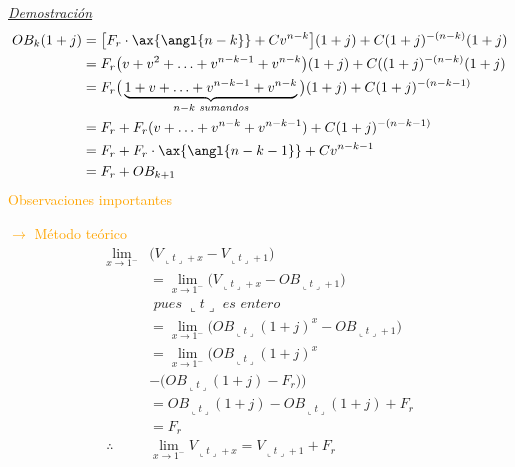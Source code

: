 \underline{\textit{Demostración}}
\begin{align*}
    OB_k(1+j) &= \big[F_r\cdot \ax{\angl{n-k}} + Cv^{n-k}\big](1+j) + C(1+j)^{-(n-k)}(1+j)\\
    &= F_r\big(v+v^2+\dotsc+v^{n-k-1}+v^{n-k}\big)(1+j) + C((1+j)^{-(n-k)}(1+j)\\
    &= F_r\big(\underbrace{1+v+\dotsc+v^{n-k-1}+v^{n-k}}_{n-k\textit{ sumandos}}\big)(1+j) + C(1+j)^{-(n-k-1)}\\
    &= F_r + F_r(v+\dotsc+v^{n-k}+v^{n-k-1}) + C(1+j)^{-(n-k-1)}\\
    &= F_r + F_r\cdot\ax{\angl{n-k-1}} + Cv^{n-k-1}\\
    &=F_r + OB_{k+1}
\end{align*}
\textcolor{orange}{Observaciones importantes}
\begin{multicols}{2}
    \textcolor{orange}{$\longrightarrow$ Método teórico}
    \begin{align*}
        \lim_{x\to1^-}&\Big(V_{\llcorner t\lrcorner+x} - V_{\llcorner t\lrcorner+1}\Big)\\
        &=\lim_{x\to1^-}\Big(V_{\llcorner t\lrcorner+x} - OB_{\llcorner t\lrcorner+1}\Big)\\
        &\textit{ pues }\llcorner t\lrcorner\textit{ es entero}\\
        &=\lim_{x\to1^-}\Big(OB_{\llcorner t\lrcorner}(1+j)^x - OB_{\llcorner t\lrcorner+1}\Big)\\
        &=\lim_{x\to1^-}\Big(OB_{\llcorner t\lrcorner}(1+j)^x \\
        &- \big(OB_{\llcorner t\lrcorner}(1+j)-F_r\big)\Big)\\
        &= OB_{\llcorner t\lrcorner}(1+j) - OB_{\llcorner t\lrcorner}(1+j) + F_r\\
        &= F_r\\
        \therefore& \lim_{x\to1^-} V_{\llcorner t\lrcorner+x} = V_{\llcorner t\lrcorner+1}+F_r
    \end{align*}
    
    \columnbreak
    

\end{multicols}
